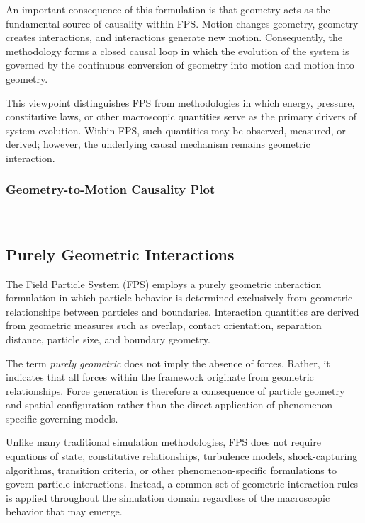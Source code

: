 An important consequence of this formulation is that
geometry acts as the fundamental source of causality
within FPS. Motion changes geometry, geometry creates
interactions, and interactions generate new motion.
Consequently, the methodology forms a closed causal loop
in which the evolution of the system is governed by the
continuous conversion of geometry into motion and motion
into geometry.

This viewpoint distinguishes FPS from methodologies in
which energy, pressure, constitutive laws, or other
macroscopic quantities serve as the primary drivers of
system evolution. Within FPS, such quantities may be
observed, measured, or derived; however, the underlying
causal mechanism remains geometric interaction.

\subsubsection{Geometry-to-Motion Causality Plot}
\begin{verbatim}


\end{verbatim}

\subsection{Purely Geometric Interactions}

The Field Particle System (FPS) employs a purely geometric
interaction formulation in which particle behavior is
determined exclusively from geometric relationships between
particles and boundaries. Interaction quantities are derived
from geometric measures such as overlap, contact orientation,
separation distance, particle size, and boundary geometry.

The term \emph{purely geometric} does not imply the absence of
forces. Rather, it indicates that all forces within the
framework originate from geometric relationships. Force
generation is therefore a consequence of particle geometry and
spatial configuration rather than the direct application of
phenomenon-specific governing models.

Unlike many traditional simulation methodologies, FPS does not
require equations of state, constitutive relationships,
turbulence models, shock-capturing algorithms, transition
criteria, or other phenomenon-specific formulations to govern
particle interactions. Instead, a common set of geometric
interaction rules is applied throughout the simulation domain
regardless of the macroscopic behavior that may emerge.

